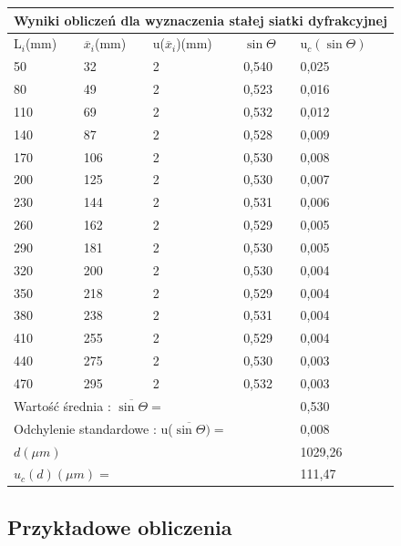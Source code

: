 \documentclass[12pt]{article}
\begin{document}
\begin{table}[!ht]
    \centering
    \begin{tabular}{|l|l|l|l|l|}
    \hline
    \multicolumn{5}{|l|}{Wyniki obliczeń dla wyznaczenia stałej siatki dyfrakcyjnej} \\
    \hline
        L$_i$(mm) & $\overline{x}_i$(mm) & u($\overline{x}_i$)(mm) & $\sin \Theta$ & u$_c(\sin \Theta)$ \\ \hline
        50 & 32 & 2 & 0,540 & 0,025 \\ \hline
        80 & 49 & 2 & 0,523 & 0,016 \\ \hline
        110 & 69 & 2 & 0,532 & 0,012 \\ \hline
        140 & 87 & 2 & 0,528 & 0,009 \\ \hline
        170 & 106 & 2 & 0,530 & 0,008 \\ \hline
        200 & 125 & 2 & 0,530 & 0,007 \\ \hline
        230 & 144 & 2 & 0,531 & 0,006 \\ \hline
        260 & 162 & 2 & 0,529 & 0,005 \\ \hline
        290 & 181 & 2 & 0,530 & 0,005 \\ \hline
        320 & 200 & 2 & 0,530 & 0,004 \\ \hline
        350 & 218 & 2 & 0,529 & 0,004 \\ \hline
        380 & 238 & 2 & 0,531 & 0,004 \\ \hline
        410 & 255 & 2 & 0,529 & 0,004 \\ \hline
        440 & 275 & 2 & 0,530 & 0,003 \\ \hline
        470 & 295 & 2 & 0,532 & 0,003 \\ \hline
    \multicolumn{4}{|l|}{Wartość średnia : $\overline{\sin \Theta}=$} & 0,530 \\ \hline
    \multicolumn{4}{|l|}{Odchylenie standardowe : u($\overline{\sin \Theta})=$} & 0,008 \\ \hline
    \multicolumn{4}{|l|}{$d(\mu m)$} & 1029,26 \\ \hline
    \multicolumn{4}{|l|}{$u_c(d)(\mu m)=$} & 111,47 \\ \hline
    \end{tabular}
\end{table}

\subsection{Przykładowe obliczenia}
\end{document}
